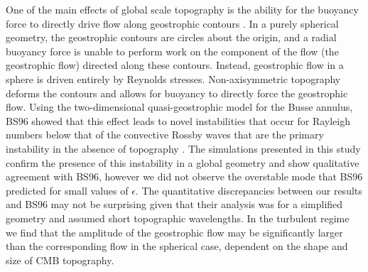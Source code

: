 One of the main effects of global scale topography is the ability for the buoyancy force to directly drive flow along geostrophic contours \citep{pB96}. In a purely spherical geometry, the geostrophic contours are circles about the origin, and a radial buoyancy force is unable to perform work on the component of the flow (the geostrophic flow) directed along these contours. Instead, geostrophic flow in a sphere is driven entirely by Reynolds stresses.
Non-axisymmetric topography deforms the contours and allows for buoyancy to directly force the geostrophic flow. Using the two-dimensional quasi-geostrophic model for the Busse annulus, BS96 showed that this effect leads to novel instabilities that occur for Rayleigh numbers below that of the convective Rossby waves that are the primary instability in the absence of topography \citep{sC61,cJ00}.
The simulations presented in this study confirm the presence of this instability in a global geometry and show qualitative agreement with BS96, however we did not observe the overstable mode that BS96 predicted for small values of $\epsilon$. The quantitative discrepancies between our results and BS96 may not be surprising given that their analysis was for a simplified geometry and assumed short topographic wavelengths.
In the turbulent regime we find that the amplitude of the geostrophic flow may be significantly larger than the corresponding flow in the spherical case, dependent on the shape and size of CMB topography. 






